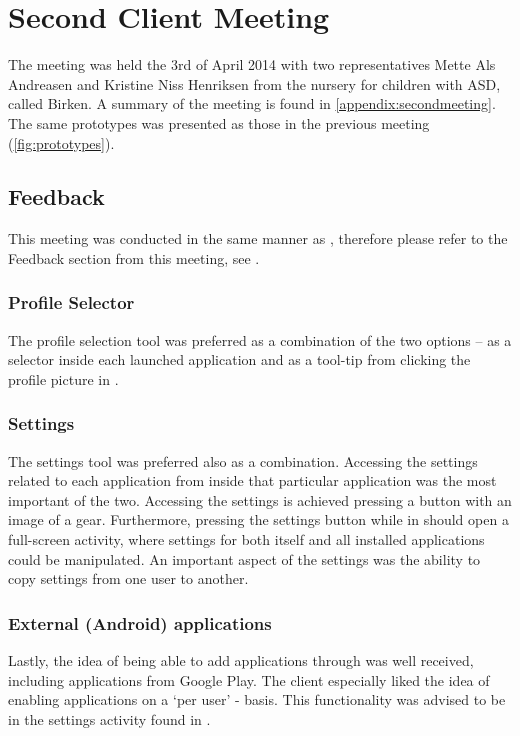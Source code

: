 \section{Second Client Meeting}\label{sec:sprint2:secondmeeting}
The meeting was held the 3rd of April 2014 with two representatives Mette Als Andreasen and Kristine Niss Henriksen from the nursery for children with ASD, called Birken.
A summary of the meeting is found in \cref{appendix:secondmeeting}.
The same prototypes was presented as those in the previous meeting (\cref{fig:prototypes}).

\subsection{Feedback}
This meeting was conducted in the same manner as , therefore please refer to the Feedback section from this meeting, see .

\subsubsection*{Profile Selector}
The profile selection tool was preferred as a combination of the two options -- as a selector inside each launched application and as a tool-tip from clicking the profile picture in \launcher.

\subsubsection{Settings}
The settings tool was preferred also as a combination.
Accessing the settings related to each application from inside that particular application was the most important of the two. Accessing the settings is achieved pressing a button with an image of a gear.
Furthermore, pressing the settings button while in \launcher should open a full-screen activity, where settings for both \launcher itself and all installed applications could be manipulated.
An important aspect of the settings was the ability to copy settings from one user to another.

\subsubsection{External (Android) applications}
Lastly, the idea of being able to add applications through \launcher was well received, including applications from Google Play.
The client especially liked the idea of enabling applications on a `per user' - basis.
This functionality was advised to be in the settings activity found in \launcher.

